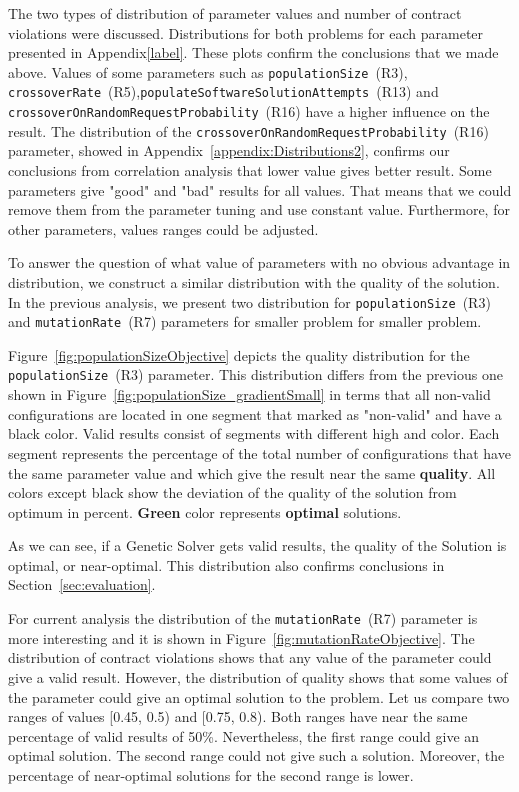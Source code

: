 The two types of distribution of parameter values and number of contract violations were discussed. Distributions for both problems for each parameter presented in Appendix\ref{label}. These plots confirm the conclusions that we made above. Values of some parameters such as \texttt{populationSize}~(R3), \texttt{crossoverRate}~(R5),\linebreak \texttt{po\-pu\-la\-te\-Soft\-wa\-re\-So\-lu\-tion\-Attempts}~(R13) and \texttt{cross\-over\-On\-Ran\-dom\-Re\-qu\-est\-Pro\-ba\-bi\-li\-ty}~(R16) have a higher influence on the result.
The distribution  of the \texttt{cross\-over\-On\-Ran\-dom\-Re\-quest\-Pro\-ba\-bi\-lity}~(R16) parameter, showed in Appendix~\ref{appendix:Distributions2}, confirms our conclusions from correlation analysis that lower value gives better result. 
Some parameters give "good" and "bad" results for all values. That means that we could remove them from the parameter tuning and use constant value. Furthermore, for other parameters, values ranges could be adjusted.

To answer the question of what value of parameters with no obvious advantage in distribution, we construct a similar distribution with the quality of the solution.
In the previous analysis, we present two distribution for \texttt{populationSize}~(R3) and \texttt{mutationRate}~(R7) parameters for smaller problem for smaller problem.

Figure~\ref{fig:populationSizeObjective} depicts the quality distribution for the \texttt{populationSize}~(R3) parameter. This distribution differs from the previous one shown in Figure~\ref{fig:populationSize_gradientSmall} in terms that all non-valid configurations are located in one segment that marked as "non-valid" and have a black color. Valid results consist of segments with different high and color. Each segment represents the percentage of the total number of configurations that have the same parameter value and which give the result near the same \textbf{quality}. All colors except black show the deviation of the quality of the solution from optimum in percent. \textbf{Green} color represents \textbf{optimal} solutions.

As we can see, if a Genetic Solver gets valid results, the quality of the Solution is optimal, or near-optimal. This distribution also confirms conclusions in Section~\ref{sec:evaluation}.

For current analysis the distribution of the \texttt{mutationRate}~(R7) parameter is more interesting and it is shown in Figure~\ref{fig:mutationRateObjective}. The distribution of contract violations shows that any value of the parameter could give a valid result. However, the distribution of quality shows that some values of the parameter could give an optimal solution to the problem. Let us compare two ranges of values [0.45, 0.5) and [0.75, 0.8). Both ranges have near the same percentage of valid results of 50\%.
Nevertheless, the first range could give an optimal solution. The second range could not give such a solution. Moreover, the percentage of near-optimal solutions for the second range is lower.


